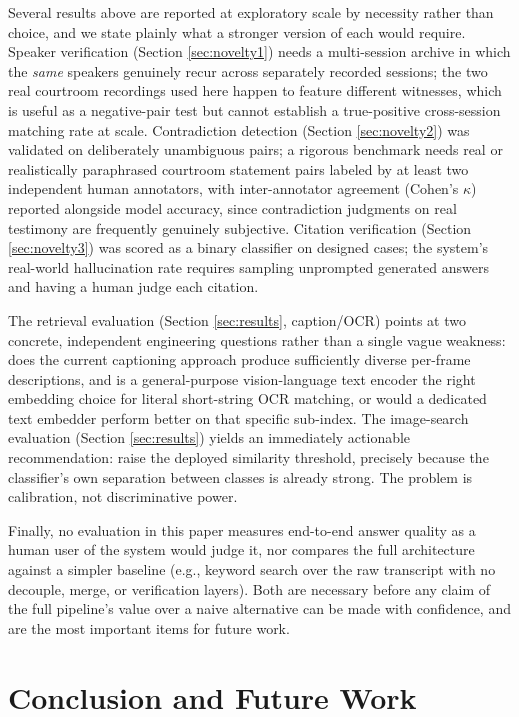 \documentclass[3p,times,procedia]{elsarticle}
\begin{document}
Several results above are reported at exploratory scale by necessity rather than
choice, and we state plainly what a stronger version of each would require. Speaker
verification (Section \ref{sec:novelty1}) needs a multi-session archive in which the
\emph{same} speakers genuinely recur across separately recorded sessions; the two real
courtroom recordings used here happen to feature different witnesses, which is useful
as a negative-pair test but cannot establish a true-positive cross-session matching
rate at scale. Contradiction detection (Section \ref{sec:novelty2}) was validated on
deliberately unambiguous pairs; a rigorous benchmark needs real or realistically
paraphrased courtroom statement pairs labeled by at least two independent human
annotators, with inter-annotator agreement (Cohen's $\kappa$) reported alongside model
accuracy, since contradiction judgments on real testimony are frequently genuinely
subjective. Citation verification (Section \ref{sec:novelty3}) was scored as a binary
classifier on designed cases; the system's real-world hallucination rate requires
sampling unprompted generated answers and having a human judge each citation.

The retrieval evaluation (Section \ref{sec:results}, caption/OCR) points at two
concrete, independent engineering questions rather than a single vague weakness: does
the current captioning approach produce sufficiently diverse per-frame descriptions, and
is a general-purpose vision-language text encoder the right embedding choice for
literal short-string OCR matching, or would a dedicated text embedder perform better on
that specific sub-index. The image-search evaluation (Section \ref{sec:results}) yields
an immediately actionable recommendation: raise the deployed similarity threshold,
precisely because the classifier's own separation between classes is already strong. The
problem is calibration, not discriminative power.

Finally, no evaluation in this paper measures end-to-end answer quality as a human
user of the system would judge it, nor compares the full architecture against a
simpler baseline (e.g., keyword search over the raw transcript with no decouple, merge,
or verification layers). Both are necessary before any claim of the full pipeline's
value over a naive alternative can be made with confidence, and are the most important
items for future work.

\section{Conclusion and Future Work}
\label{sec:conclusion}
\end{document}

